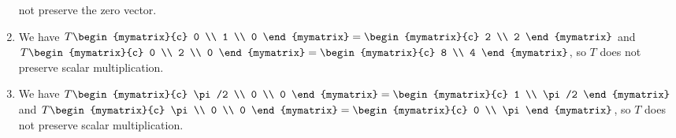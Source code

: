\begin{ex}
\begin{sol}
\begin{enumerate}
      not preserve the zero vector.
    \item We have
      $T\begin{mymatrix}{c} 0 \\ 1 \\ 0 \end{mymatrix}
      = \begin{mymatrix}{c} 2 \\ 2 \end{mymatrix}$ and
      $T\begin{mymatrix}{c} 0 \\ 2 \\ 0 \end{mymatrix}
      = \begin{mymatrix}{c} 8 \\ 4 \end{mymatrix}$, so $T$ does not
      preserve scalar multiplication.
    \item We have
      $T\begin{mymatrix}{c} \pi/2 \\ 0 \\ 0 \end{mymatrix}
      = \begin{mymatrix}{c} 1 \\ \pi/2 \end{mymatrix}$ and
      $T\begin{mymatrix}{c} \pi \\ 0 \\ 0 \end{mymatrix}
      = \begin{mymatrix}{c} 0 \\ \pi \end{mymatrix}$, so $T$ does not
      preserve scalar multiplication.
    \end{enumerate}
  \end{sol}
\end{ex}

